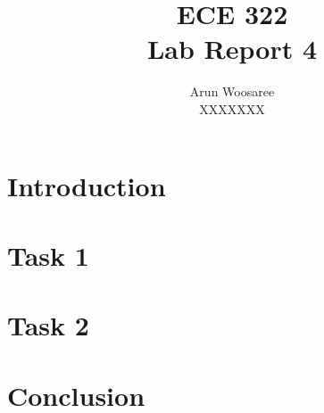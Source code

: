 \documentclass[letterpaper]{article}
\title{ECE 322 \\
Lab Report 4}
\author{Arun Woosaree\\
XXXXXXX}
\begin{document}
\maketitle

\section{Introduction}


\section{Task 1}



\section{Task 2}


\section{Conclusion}



\vfill
\appendix

%
%
%

%
%
\end{document}
